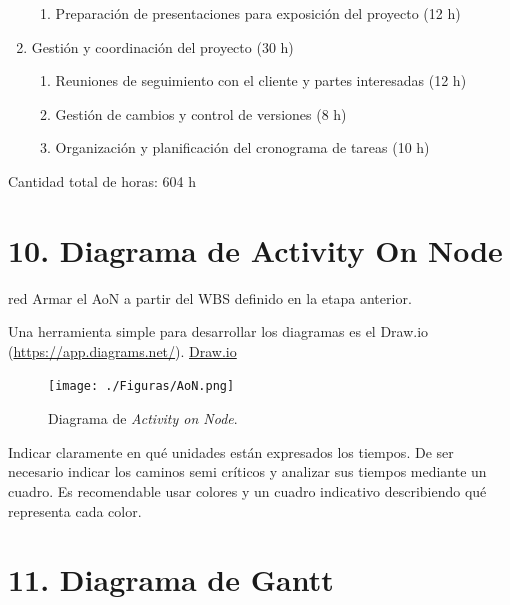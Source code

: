\documentclass[
11pt, %
]{charter}
\begin{document}
\begin{enumerate}
\begin{enumerate}
\item Preparación de presentaciones para exposición del proyecto (12 h)
\end{enumerate}
\item Gestión y coordinación del proyecto (30 h)
\begin{enumerate}
\item Reuniones de seguimiento con el cliente y partes interesadas (12 h)
\item Gestión de cambios y control de versiones (8 h)
\item Organización y planificación del cronograma de tareas (10 h)
\end{enumerate}
\end{enumerate}

Cantidad total de horas: 604 h

\section{10. Diagrama de Activity On Node}
\label{sec:AoN}

\begin{consigna}{red}
Armar el AoN a partir del WBS definido en la etapa anterior.

Una herramienta simple para desarrollar los diagramas es el Draw.io (\url{https://app.diagrams.net/}).
\href{https://app.diagrams.net}{Draw.io}


\begin{figure}[htpb]
\centering 
\texttt{[image: ./Figuras/AoN.png]}
\caption{Diagrama de \textit{Activity on Node}.}
\label{fig:AoN}
\end{figure}

Indicar claramente en qué unidades están expresados los tiempos.
De ser necesario indicar los caminos semi críticos y analizar sus tiempos mediante un cuadro.
Es recomendable usar colores y un cuadro indicativo describiendo qué representa cada color.

\end{consigna}

\section{11. Diagrama de Gantt}
\label{sec:gantt}
\end{document}

